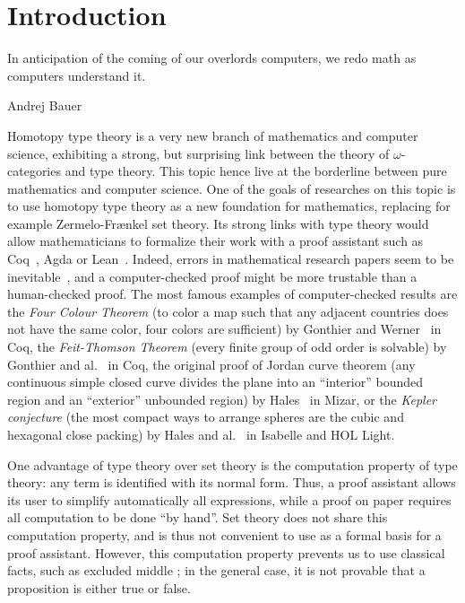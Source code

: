 \chapter{Introduction}
\label{chap:intro}
\epigraph{In anticipation of the coming of our overlords computers, we
  redo math as computers understand it.}{Andrej Bauer}

Homotopy type theory is a very new branch of mathematics and computer
science, exhibiting a strong, but surprising link between the theory
of $\omega$-categories and type theory. This topic hence live at the
borderline between pure mathematics and computer science. One of the
goals of researches on this topic is to use homotopy type theory as a
new foundation for mathematics, replacing for example Zermelo-Frænkel
set theory. Its strong links with type theory would allow
mathematicians to formalize their work with a proof assistant such as
Coq~\cite{coq:refman:8.4}, Agda\cite{norell2007towards} or
Lean~\cite{lean}. Indeed, errors in mathematical research papers seem
to be inevitable~\cite{vv-univ-f}, and a computer-checked proof might
be more trustable than a human-checked proof.
The most famous examples of computer-checked results are the {\em Four
  Colour Theorem} (to color a map such that any adjacent countries
does not have the same color, four colors are sufficient) by Gonthier
and Werner~\cite{gonthier-four-color} in Coq, the {\em Feit-Thomson
  Theorem} (every finite group of odd order is solvable) by Gonthier
and al.~\cite{gonthier-feit} in Coq, the original proof of Jordan curve
theorem (any continuous simple closed curve divides the plane into an
``interior'' bounded region and an ``exterior'' unbounded region) by
Hales~\cite{hales-jordan} in Mizar, or the {\em Kepler conjecture}
(the most compact ways to arrange spheres are the cubic and hexagonal close
packing) by Hales and al.~\cite{hales-kepler} in Isabelle and HOL Light.

One advantage of type theory over set theory is the computation
property of type theory: any term is identified with its normal
form. Thus, a proof assistant allows its user to simplify
automatically all expressions, while a proof on paper requires all
computation to be done ``by hand''. Set theory does not share this
computation property, and is thus not convenient to use as a formal
basis for a proof assistant. However, this computation property
prevents us to use classical facts, such as excluded middle ; in the
general case, it is not provable that a proposition is either true or
false. 

